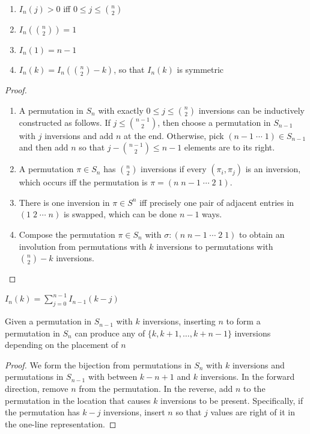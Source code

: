 \documentclass[a4paper]{article}
\begin{document}
\begin{theorem}
\;
\begin{enumerate}
\item $\displaystyle I_n(j)>0$ iff $0\leq j\leq\binom n2$
\item $\displaystyle I_n\left(\binom n2\right)=1$
\item $\displaystyle I_n(1)=n-1$
\item $\displaystyle I_n(k)=I_n\left(\binom n2-k\right)$, so that $I_n(k)$ is symmetric
\end{enumerate}

\begin{hl}
\begin{proof}
\;
\begin{enumerate}
\item A permutation in $S_n$ with exactly $0\leq j\leq\binom n2$ inversions can be inductively constructed as follows. If $j\leq\binom{n-1}2$, then choose a permutation in $S_{n-1}$ with $j$ inversions and add $n$ at the end. Otherwise, pick $(n-1\;\cdots\;1)\in S_{n-1}$ and then add $n$ so that $j-\binom{n-1}2\leq n-1$ elements are to its right.
\item A permutation $\pi\in S_n$ has $\binom n2$ inversions if every $(\pi_i,\pi_j)$ is an inversion, which occurs iff the permutation is $\pi=(n\;n-1\;\cdots\;2\;1)$.
\item There is one inversion in $\pi\in S^n$ iff precisely one pair of adjacent entries in $(1\;2\;\cdots\;n)$ is swapped, which can be done $n-1$ ways.
\item Compose the permutation $\pi\in S_n$ with $\sigma:(n\;n-1\;\cdots\;2\;1)$ to obtain an involution from permutations with $k$ inversions to permutations with $\binom n2-k$ inversions.
\end{enumerate}
\end{proof}
\end{hl}
\end{theorem}

\begin{theorem}\label{inversion_recurrence}
$\displaystyle I_n(k)=\sum_{j=0}^{n-1}I_{n-1}(k-j)$
\begin{arrows}
\item Given a permutation in $S_{n-1}$ with $k$ inversions, inserting $n$ to form a permutation in $S_n$ can produce any of $\{k,k+1,\dots,k+n-1\}$ inversions depending on the placement of $n$
\end{arrows}
\begin{hl}
\begin{proof}
We form the bijection from permutations in $S_n$ with $k$ inversions and permutations in $S_{n-1}$ with between $k-n+1$ and $k$ inversions. In the forward direction, remove $n$ from the permutation. In the reverse, add $n$ to the permutation in the location that causes $k$ inversions to be present. Specifically, if the permutation has $k-j$ inversions, insert $n$ so that $j$ values are right of it in the one-line representation.
\end{proof}
\end{hl}
\end{theorem}
\end{document}
